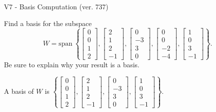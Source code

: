 \begin{exercise}
  \begin{exerciseTitle}V7 - Basis Computation (ver. 737)\end{exerciseTitle}
  \begin{exerciseStatement}
    Find a basis for the subspace 
\[W=\mathrm{span}\ \left\{\left[\begin{array}{r}
0 \\
0 \\
1 \\
2
\end{array}\right] , \left[\begin{array}{r}
2 \\
1 \\
2 \\
-1
\end{array}\right] , \left[\begin{array}{r}
0 \\
-3 \\
3 \\
0
\end{array}\right] , \left[\begin{array}{r}
0 \\
0 \\
-2 \\
-4
\end{array}\right] , \left[\begin{array}{r}
1 \\
0 \\
3 \\
-1
\end{array}\right]\right\}.\]
 Be sure to explain why your result is a basis.


  \end{exerciseStatement}
  \begin{exerciseAnswer}
   A basis of \(W\) is  \(\left\{\left[\begin{array}{r}
0 \\
0 \\
1 \\
2
\end{array}\right] , \left[\begin{array}{r}
2 \\
1 \\
2 \\
-1
\end{array}\right] , \left[\begin{array}{r}
0 \\
-3 \\
3 \\
0
\end{array}\right] , \left[\begin{array}{r}
1 \\
0 \\
3 \\
-1
\end{array}\right]\right\}\).
  


  \end{exerciseAnswer}
\end{exercise}